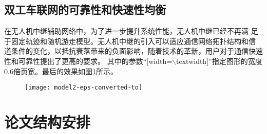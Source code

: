 \subsection{双工车联网的可靠性和快速性均衡}\label{section1-3-3}
\textcolor[RGB]{202,12,22}{在无人机中继辅助网络中，为了进一步提升系统性能，无人机中继已经不再满
足于固定轨迹和随机游走模型。无人机中继的引入可以适应通信网络拓扑结构和信
道条件的变化，以抵抗衰落带来的负面影响，随着技术的革新，用户对于通信快速
性和可靠性提出了更高的要求。}
其中的参数“[width=$\backslash$textwidth]”指定图形的宽度0.6倍页宽。最后的效果如图\ref{本文结构}所示。
\begin{figure}[hptb!]
 \centering\small
 \texttt{[image: model2-eps-converted-to]}
 \label{本文结构}
\end{figure}

\begin{comment}
\subsubsection{款标题}\label{section1-3-1-1}
\quad 论文的框架分为：章节条款等，分别由下列一些命令生成。由\verb|\chapter{}| 生成章标题，由\verb|\section{}|生成节标题，由\verb|\subsection{}| 生成条标题， 由命令\verb|\subsubsection{}| 生成款标题。

\end{comment}

\section{论文结构安排}\label{section1-4}

